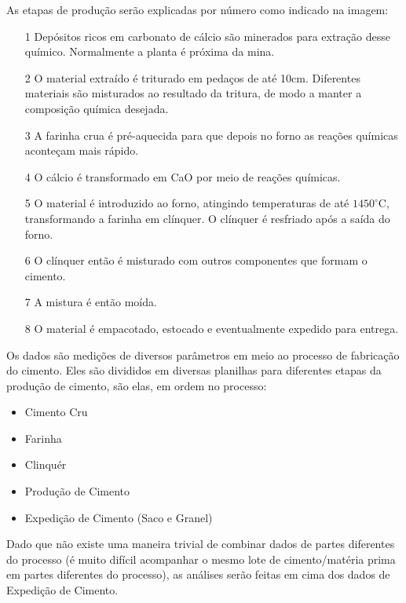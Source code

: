 As etapas de produção serão explicadas por número como indicado na imagem: \\

\begin{itemize}

\item[1] Depósitos ricos em carbonato de cálcio são minerados para extração desse químico. Normalmente a planta é próxima da mina.
\item[2] O material extraído é triturado em pedaços de até 10cm. Diferentes materiais são misturados ao resultado da tritura, de modo a manter a composição química desejada. 
\item[3] A farinha crua é pré-aquecida para que depois no forno as reações químicas aconteçam mais rápido. 
\item[4] O cálcio é transformado em CaO por meio de reações químicas.  
\item[5] O material é introduzido ao forno, atingindo temperaturas de até $1450^\circ$C, transformando a farinha em clínquer. O clínquer é resfriado após a saída do forno. 
\item[6] O clínquer então é misturado com outros componentes que formam o cimento.
\item[7] A mistura é então moída.
\item[8] O material é empacotado, estocado e eventualmente expedido para entrega.

\end{itemize}

Os dados são medições de diversos parâmetros em meio ao processo de fabricação do cimento. Eles são divididos em diversas planilhas para diferentes etapas da produção de cimento, são elas, em ordem no processo:

\begin{itemize}
        \item Cimento Cru
        \item Farinha
        \item Clinquér
        \item Produção de Cimento
        \item Expedição de Cimento (Saco e Granel)
\end{itemize}

Dado que não existe uma maneira trivial de combinar dados de partes diferentes do processo (é muito difícil acompanhar o mesmo lote de cimento/matéria prima em partes diferentes do processo), as análises serão feitas em cima dos dados de Expedição de Cimento.

